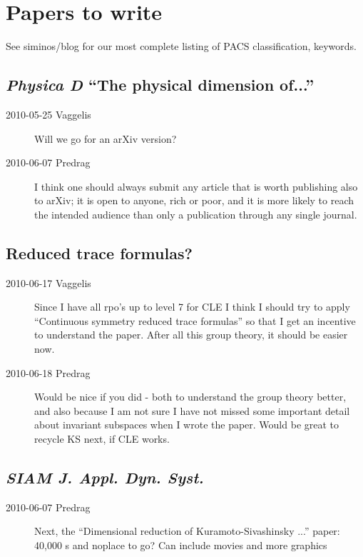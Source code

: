 \section{Papers to write}

See siminos/blog for our most complete listing of
PACS classification, keywords.

\subsection{\emph{Physica D} ``The physical dimension of...''}

\begin{description}

\item[2010-05-25 Vaggelis]
Will we go for an arXiv version?

\item[2010-06-07 Predrag]
I think one should always submit
any article that is worth publishing also to arXiv;
it is open to anyone, rich or poor, and it is
more likely to reach the intended audience than only a publication through
any single journal.

\end{description}

\subsection{Reduced trace formulas?}

\begin{description}
 \item[2010-06-17 Vaggelis]
Since I have all rpo's up to level 7 for CLE I think I should try
to apply ``Continuous symmetry reduced trace formulas'' so that I get an incentive
to understand the paper. After all this group theory, it should be easier now.
 \item[2010-06-18 Predrag]
Would be nice if you did - both to understand the group theory better, and
also because I am not sure I have not missed some important detail about
invariant subspaces when I wrote the paper. Would be great to recycle KS
next, if CLE works.
\end{description}


\subsection{\emph{SIAM J. Appl. Dyn. Syst.}}

\begin{description}

\item[2010-06-07 Predrag] Next, the
``Dimensional reduction of Kuramoto-Sivashinsky ...'' paper:
40,000 \rpo s and noplace to go?
Can include movies and more graphics

\end{description}
